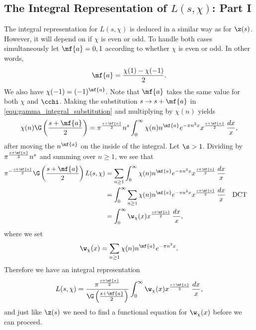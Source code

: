     \subsection*{The Integral Representation of \texorpdfstring{$L(s,\chi)$}{L(s,\chi)}: Part I}
      The integral representation for $L(s,\chi)$ is deduced in a similar way as for $\z(s)$. However, it will depend on if $\chi$ is even or odd. To handle both cases simultaneously let $\mf{a} = 0,1$ according to whether $\chi$ is even or odd. In other words,
      \[
        \mf{a} = \frac{\chi(1)-\chi(-1)}{2}.
      \]
      We also have $\chi(-1) = (-1)^{\mf{a}}$. Note that $\mf{a}$ takes the same value for both $\chi$ and $\cchi$. Making the substitution $s \to s+\mf{a}$ in \cref{equ:gamma_integral_substitution} and multiplying by $\chi(n)$ yields
      \[
        \chi(n)\G\left(\frac{s+\mf{a}}{2}\right) = \pi^{\frac{s+\mf{a}}{2}} n^{s}\int_{0}^{\infty}\chi(n)n^{\mf{a}}e^{-\pi n^{2}x}x^{\frac{s+\mf{a}}{2}}\,\frac{dx}{x},
      \]
      after moving the $n^{\mf{a}}$ on the inside of the integral. Let $\s > 1$. Dividing by $\pi^{\frac{s+\mf{a}}{2}}n^{s}$ and summing over $n \ge 1$, we see that
      \begin{align*}
        \pi^{-\frac{s+\mf{a}}{2}}\G\left(\frac{s+\mf{a}}{2}\right)L(s,\chi) &= \sum_{n \ge 1}\int_{0}^{\infty}\chi(n)n^{\mf{a}}e^{-\pi n^{2}x}x^{\frac{s+\mf{a}}{2}}\,\frac{dx}{x} \\
        &= \int_{0}^{\infty}\sum_{n \ge 1}\chi(n)n^{\mf{a}}e^{-\pi n^{2}x}x^{\frac{s+\mf{a}}{2}}\,\frac{dx}{x} && \text{DCT} \\
        &= \int_{0}^{\infty}\w_{\chi}(x)x^{\frac{s+\mf{a}}{2}}\,\frac{dx}{x},
      \end{align*}
      where we set
      \[
        \w_{\chi}(x) = \sum_{n \ge 1}\chi(n)n^{\mf{a}}e^{-\pi n^{2}x}.
      \]
      Therefore we have an integral representation
      \begin{equation}\label{equ:integral_representation_Dirichlet_L-functions_1}
        L(s,\chi) = \frac{\pi^{\frac{s+\mf{a}}{2}}}{\G\left(\frac{s+\mf{a}}{2}\right)}\int_{0}^{\infty}\w_{\chi}(x)x^{\frac{s+\mf{a}}{2}}\,\frac{dx}{x},
      \end{equation}
      and just like $\z(s)$ we need to find a functional equation for $\w_{\chi}(x)$ before we can proceed.
